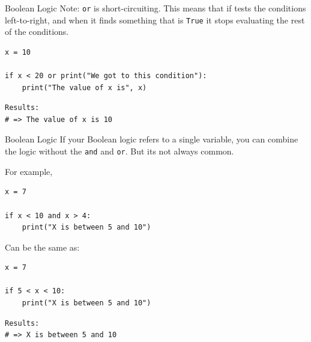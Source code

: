 \documentclass[10pt]{beamer}
\begin{document}
\begin{frame}[label={sec:orgc79b1e1},fragile]{Boolean Logic}
 Note: \texttt{or} is short-circuiting. This means that if tests the conditions left-to-right,
and when it finds something that is \texttt{True} it stops evaluating the rest of the
conditions.

\begin{verbatim}
x = 10

if x < 20 or print("We got to this condition"):
    print("The value of x is", x) 
\end{verbatim}

\begin{verbatim}
Results: 
# => The value of x is 10
\end{verbatim}
\end{frame}

\begin{frame}[label={sec:org16de43f},fragile]{Boolean Logic}
 If your Boolean logic refers to a single variable, you can combine the logic without
the \texttt{and} and \texttt{or}. But its not always common.

For example,

\begin{verbatim}
x = 7

if x < 10 and x > 4:
    print("X is between 5 and 10")
\end{verbatim}

Can be the same as:

\begin{verbatim}
x = 7

if 5 < x < 10:
    print("X is between 5 and 10")
\end{verbatim}

\begin{verbatim}
Results: 
# => X is between 5 and 10
\end{verbatim}
\end{frame}
\end{document}

